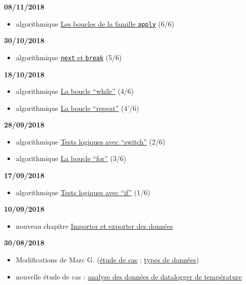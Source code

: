 \documentclass[]{book}
\providecommand{\tightlist}{%
  \setlength{\itemsep}{0pt}\setlength{\parskip}{0pt}}
\theoremstyle{definition}
\theoremstyle{definition}
\theoremstyle{definition}
\theoremstyle{remark}
\begin{document}
\textbf{08/11/2018}

\begin{itemize}
\tightlist
\item
  algorithmique \protect\hyperlink{l17applyfamily}{Les boucles de la
  famille \texttt{apply}} (6/6)
\end{itemize}

\textbf{30/10/2018}

\begin{itemize}
\tightlist
\item
  algorithmique \protect\hyperlink{l17spe}{\texttt{next} et
  \texttt{break}} (5/6)
\end{itemize}

\textbf{18/10/2018}

\begin{itemize}
\tightlist
\item
  algorithmique \protect\hyperlink{l17while}{La boucle ``while''} (4/6)
\item
  algorithmique \protect\hyperlink{l17repeat}{La boucle ``repeat''}
  (4'/6)
\end{itemize}

\textbf{28/09/2018}

\begin{itemize}
\tightlist
\item
  algorithmique \protect\hyperlink{l17switch}{Tests logiques avec
  ``switch''} (2/6)
\item
  algorithmique \protect\hyperlink{l17for}{La boucle ``for''} (3/6)
\end{itemize}

\textbf{17/09/2018}

\begin{itemize}
\tightlist
\item
  algorithmique \protect\hyperlink{l17if}{Tests logiques avec ``if''}
  (1/6)
\end{itemize}

\textbf{10/09/2018}

\begin{itemize}
\tightlist
\item
  nouveau chapitre \protect\hyperlink{import}{Importer et exporter des
  données}
\end{itemize}

\textbf{30/08/2018}

\begin{itemize}
\tightlist
\item
  Modifications de Marc G. (\protect\hyperlink{studyCase002}{étude de
  cas} ; \protect\hyperlink{dataType1}{types de données})
\item
  nouvelle étude de cas : \protect\hyperlink{studyCase001}{analyse des
  données de datalogger de température}
\end{itemize}
\end{document}
